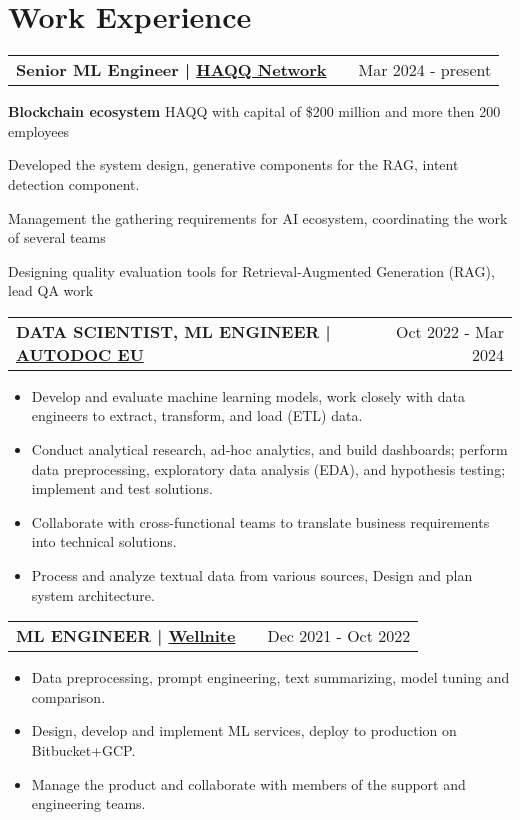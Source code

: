 \documentclass[a4paper,12pt]{article}
\makeatletter
\newenvironment{jobshort}[2]
    {
    \begin{tabularx}{\linewidth}{@{}l X r@{}}
    \textbf{#1} & \hfill &  #2 \\[3.75pt]
    \end{tabularx}
    }
    {
    }
\newenvironment{joblong}[2]
    {
    \begin{tabularx}{\linewidth}{@{}l X r@{}}
    \textbf{#1} & \hfill &  #2 \\[3.75pt]
    \end{tabularx}
    \begin{minipage}[t]{\linewidth}
    \begin{itemize}[nosep,after=\strut, leftmargin=1em, itemsep=3pt,label=--]
    }
    {
    \end{itemize}
    \end{minipage}    
    }
\makeatother
\begin{document}
\section{Work Experience}

\begin{jobshort}{Senior ML Engineer | \href{https://haqq.network/}{HAQQ Network}}{Mar 2024 - present}
\footnotesize \textbf{Blockchain ecosystem} HAQQ with capital of \$200 million and more then 200 employees \\
\item Developed the system design, generative components for the RAG, intent detection component.
\item Management the gathering requirements for AI ecosystem, coordinating the work of several teams
\item Designing quality evaluation tools for Retrieval-Augmented Generation (RAG), lead QA work
\end{jobshort}


\begin{joblong}{DATA SCIENTIST, ML ENGINEER | \href{https://www.autodoc.eu/}{AUTODOC EU}}{Oct 2022 - Mar 2024}
\footnotesize EU top \textbf{car-parts e-store} with €1.1B in sales and 5.2M products. Operating in 27 EU countries, 5000+ employees at 8 sites\\
\item Develop and evaluate machine learning models, work closely with data engineers to extract, transform, and load (ETL) data.
\item Conduct analytical research, ad-hoc analytics, and build dashboards; perform data preprocessing, exploratory data analysis (EDA), and hypothesis testing; implement and test solutions.
\item Collaborate with cross-functional teams to translate business requirements into technical solutions.
\item Process and analyze textual data from various sources, Design and plan system architecture.
\end{joblong}


\begin{joblong}{ML ENGINEER | \href{wellnite.com}{Wellnite}}{Dec 2021 - Oct 2022}
\footnotesize  Well-being \textbf{self-care} and \textbf{medtech} startup hit \$17.6M revenue in 2023 with a 67 person team.\\
\item Data preprocessing, prompt engineering, text summarizing, model tuning and comparison.
\item Design, develop and implement ML services, deploy to production on Bitbucket+GCP.
\item Manage the product and collaborate with members of the support and engineering teams.
\end{joblong}
\end{document}
